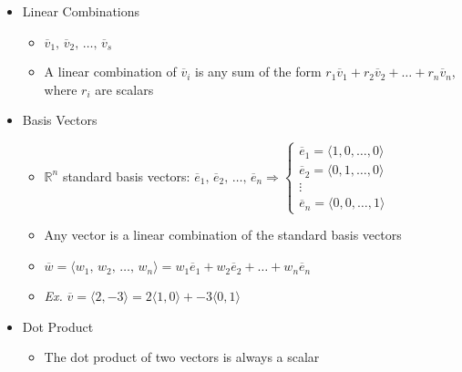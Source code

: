 \begin{itemize}
\begin{itemize}
    \end{itemize}

  \item Linear Combinations

    \begin{itemize}

      \item $\overline{v}_1,\,\overline{v}_2,\,\dots,\,\overline{v}_s$

      \item A linear combination of $\overline{v}_i$ is any sum of the form $r_1\overline{v}_1+r_2\overline{v}_2+\dots+r_n\overline{v}_n$, where $r_i$ are scalars

    \end{itemize}

  \item Basis Vectors

    \begin{itemize}

      \item $\mathbb{R}^n$ standard basis vectors: $\overline{e}_1,\,\overline{e}_2,\,\dots,\,\overline{e}_n\Rightarrow\left\{\begin{array}{c} \overline{e}_1=\langle 1, 0, \dots, 0\rangle\\\overline{e}_2=\langle 0, 1, \dots, 0\rangle\\ \vdots\\ \overline{e}_n = \langle 0, 0, \dots, 1\rangle\end{array}$

      \item Any vector is a linear combination of the standard basis vectors

      \item $\overline{w}=\langle w_1,\,w_2,\,\dots,\,w_n\rangle= w_1\overline{e}_1 + w_2\overline{e}_2 + \dots + w_n\overline{e}_n$

      \item \textit{Ex.} $\overline{v}=\langle 2, -3 \rangle = 2\langle 1, 0 \rangle + -3 \langle 0, 1 \rangle$

    \end{itemize}

  \item Dot Product

    \begin{itemize}

      \item The dot product of two vectors is always a scalar


\end{itemize}
\end{itemize}
